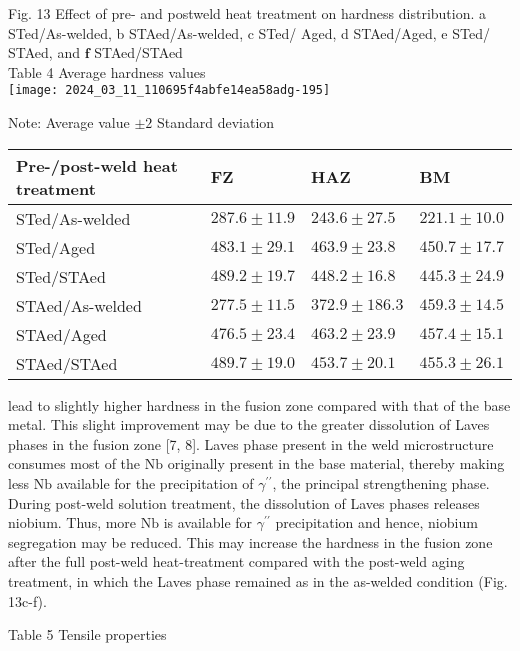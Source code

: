 \documentclass[10pt]{article}
\begin{document}
Fig. 13 Effect of pre- and postweld heat treatment on hardness distribution. a STed/As-welded, b STAed/As-welded, c STed/ Aged, d STAed/Aged, e STed/ STAed, and $\mathbf{f}$ STAed/STAed\\
Table 4 Average hardness values\\
\texttt{[image: 2024\_03\_11\_110695f4abfe14ea58adg-195]}

Note: Average value $\pm 2$ Standard deviation

\begin{center}
\begin{tabular}{llll}
\hline
Pre-/post-weld heat treatment & FZ & HAZ & BM \\
\hline
STed/As-welded & $287.6 \pm 11.9$ & $243.6 \pm 27.5$ & $221.1 \pm 10.0$ \\
STed/Aged & $483.1 \pm 29.1$ & $463.9 \pm 23.8$ & $450.7 \pm 17.7$ \\
STed/STAed & $489.2 \pm 19.7$ & $448.2 \pm 16.8$ & $445.3 \pm 24.9$ \\
STAed/As-welded & $277.5 \pm 11.5$ & $372.9 \pm 186.3$ & $459.3 \pm 14.5$ \\
STAed/Aged & $476.5 \pm 23.4$ & $463.2 \pm 23.9$ & $457.4 \pm 15.1$ \\
STAed/STAed & $489.7 \pm 19.0$ & $453.7 \pm 20.1$ & $455.3 \pm 26.1$ \\
\hline
\end{tabular}
\end{center}

lead to slightly higher hardness in the fusion zone compared with that of the base metal. This slight improvement may be due to the greater dissolution of Laves phases in the fusion zone [7, 8]. Laves phase present in the weld microstructure consumes most of the $\mathrm{Nb}$ originally present in the base material, thereby making less $\mathrm{Nb}$ available for the precipitation of $\gamma^{\prime \prime}$, the principal strengthening phase.\\
During post-weld solution treatment, the dissolution of Laves phases releases niobium. Thus, more $\mathrm{Nb}$ is available for $\gamma^{\prime \prime}$ precipitation and hence, niobium segregation may be reduced. This may increase the hardness in the fusion zone after the full post-weld heat-treatment compared with the post-weld aging treatment, in which the Laves phase remained as in the as-welded condition (Fig. 13c-f).

Table 5 Tensile properties
\end{document}
